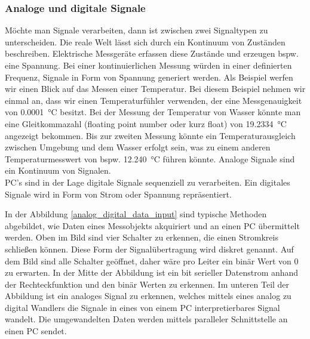 \subsubsection{Analoge und digitale Signale}

Möchte man Signale verarbeiten, dann ist zwischen zwei Signaltypen zu unterscheiden. Die reale Welt lässt sich durch ein Kontinuum von Zuständen beschreiben. Elektrische Messgeräte erfassen diese Zustände und erzeugen bspw. eine Spannung. Bei einer kontinuierlichen Messung würden in einer definierten Frequenz, Signale in Form von Spannung generiert werden. Als Beispiel werfen wir einen Blick auf das Messen einer Temperatur. Bei diesem Beispiel nehmen wir einmal an, dass wir einen Temperaturfühler verwenden, der eine Messgenauigkeit von \SI{0.0001}{\degreeCelsius} besitzt. Bei der Messung der Temperatur von Wasser könnte man eine Gleitkommazahl (floating point number oder kurz float) von \SI{19,2334}{\degreeCelsius} angezeigt bekommen. Bis zur zweiten Messung könnte ein Temperaturausgleich zwischen Umgebung und dem Wasser erfolgt sein, was zu einem anderen Temperaturmesswert von bspw. \SI{12,240}{\degreeCelsius} führen könnte. Analoge Signale sind ein Kontinuum von Signalen. \\

PC's sind in der Lage digitale Signale sequenziell zu verarbeiten. Ein digitales Signale wird in Form von Strom oder Spannung repräsentiert. 


In der Abbildung \ref{analog_digital_data_input} sind typische Methoden abgebildet, wie Daten eines Messobjekts akquiriert und an einen PC übermittelt werden. Oben im Bild sind vier Schalter zu erkennen, die einen Stromkreis schließen können. Diese Form der Signalübertragung wird diskret genannt. Auf dem Bild sind alle Schalter geöffnet, daher wäre pro Leiter ein binär Wert von 0 zu erwarten. In der Mitte der Abbildung ist ein bit serieller Datenstrom anhand der Rechteckfunktion und den binär Werten zu erkennen. Im unteren Teil der Abbildung ist ein analoges Signal zu erkennen, welches mittels eines analog zu digital Wandlers die Signale in eines von einem PC interpretierbares Signal wandelt. Die umgewandelten Daten werden mittels paralleler Schnittstelle an einen PC sendet.  

